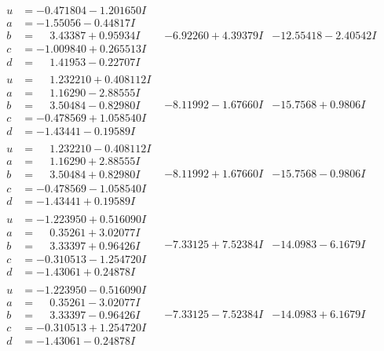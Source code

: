 \documentclass[1p]{elsarticle_modified}
\theoremstyle{definition}
\begin{document}
$$\begin{array}{c|c|c}
\begin{aligned}
u &= -0.471804 - 1.201650 I \\
a &= -1.55056 - 0.44817 I \\
b &= \phantom{-}3.43387 + 0.95934 I \\
c &= -1.009840 + 0.265513 I \\
d &= \phantom{-}1.41953 - 0.22707 I\end{aligned}
 & -6.92260 + 4.39379 I & -12.55418 - 2.40542 I \\ \hline\begin{aligned}
u &= \phantom{-}1.232210 + 0.408112 I \\
a &= \phantom{-}1.16290 - 2.88555 I \\
b &= \phantom{-}3.50484 - 0.82980 I \\
c &= -0.478569 + 1.058540 I \\
d &= -1.43441 - 0.19589 I\end{aligned}
 & -8.11992 - 1.67660 I & -15.7568 + 0.9806 I \\ \hline\begin{aligned}
u &= \phantom{-}1.232210 - 0.408112 I \\
a &= \phantom{-}1.16290 + 2.88555 I \\
b &= \phantom{-}3.50484 + 0.82980 I \\
c &= -0.478569 - 1.058540 I \\
d &= -1.43441 + 0.19589 I\end{aligned}
 & -8.11992 + 1.67660 I & -15.7568 - 0.9806 I \\ \hline\begin{aligned}
u &= -1.223950 + 0.516090 I \\
a &= \phantom{-}0.35261 + 3.02077 I \\
b &= \phantom{-}3.33397 + 0.96426 I \\
c &= -0.310513 - 1.254720 I \\
d &= -1.43061 + 0.24878 I\end{aligned}
 & -7.33125 + 7.52384 I & -14.0983 - 6.1679 I \\ \hline\begin{aligned}
u &= -1.223950 - 0.516090 I \\
a &= \phantom{-}0.35261 - 3.02077 I \\
b &= \phantom{-}3.33397 - 0.96426 I \\
c &= -0.310513 + 1.254720 I \\
d &= -1.43061 - 0.24878 I\end{aligned}
 & -7.33125 - 7.52384 I & -14.0983 + 6.1679 I\\

\end{array}$$
\end{document}
